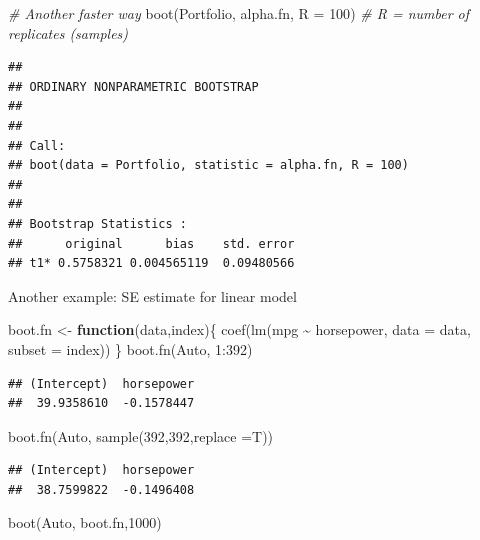 \documentclass[
]{book}
\newenvironment{Shaded}{\begin{snugshade}}{\end{snugshade}}
\newcommand{\AttributeTok}[1]{\textcolor[rgb]{0.77,0.63,0.00}{#1}}
\newcommand{\CommentTok}[1]{\textcolor[rgb]{0.56,0.35,0.01}{\textit{#1}}}
\newcommand{\ControlFlowTok}[1]{\textcolor[rgb]{0.13,0.29,0.53}{\textbf{#1}}}
\newcommand{\DecValTok}[1]{\textcolor[rgb]{0.00,0.00,0.81}{#1}}
\newcommand{\FunctionTok}[1]{\textcolor[rgb]{0.00,0.00,0.00}{#1}}
\newcommand{\NormalTok}[1]{#1}
\newcommand{\OtherTok}[1]{\textcolor[rgb]{0.56,0.35,0.01}{#1}}
\newcommand{\SpecialCharTok}[1]{\textcolor[rgb]{0.00,0.00,0.00}{#1}}
\begin{document}
\begin{Shaded}
\begin{Highlighting}[]
\CommentTok{\# Another faster way}
\FunctionTok{boot}\NormalTok{(Portfolio, alpha.fn, }\AttributeTok{R =} \DecValTok{100}\NormalTok{) }\CommentTok{\# R = number of replicates (samples)}
\end{Highlighting}
\end{Shaded}

\begin{verbatim}
## 
## ORDINARY NONPARAMETRIC BOOTSTRAP
## 
## 
## Call:
## boot(data = Portfolio, statistic = alpha.fn, R = 100)
## 
## 
## Bootstrap Statistics :
##      original      bias    std. error
## t1* 0.5758321 0.004565119  0.09480566
\end{verbatim}

Another example: SE estimate for linear model

\begin{Shaded}
\begin{Highlighting}[]
\NormalTok{boot.fn }\OtherTok{\textless{}{-}} \ControlFlowTok{function}\NormalTok{(data,index)\{}
    \FunctionTok{coef}\NormalTok{(}\FunctionTok{lm}\NormalTok{(mpg }\SpecialCharTok{\textasciitilde{}}\NormalTok{ horsepower, }\AttributeTok{data =}\NormalTok{ data, }\AttributeTok{subset =}\NormalTok{ index))}
\NormalTok{\}}
\FunctionTok{boot.fn}\NormalTok{(Auto, }\DecValTok{1}\SpecialCharTok{:}\DecValTok{392}\NormalTok{)}
\end{Highlighting}
\end{Shaded}

\begin{verbatim}
## (Intercept)  horsepower 
##  39.9358610  -0.1578447
\end{verbatim}

\begin{Shaded}
\begin{Highlighting}[]
\FunctionTok{boot.fn}\NormalTok{(Auto, }\FunctionTok{sample}\NormalTok{(}\DecValTok{392}\NormalTok{,}\DecValTok{392}\NormalTok{,}\AttributeTok{replace =}\NormalTok{T))}
\end{Highlighting}
\end{Shaded}

\begin{verbatim}
## (Intercept)  horsepower 
##  38.7599822  -0.1496408
\end{verbatim}

\begin{Shaded}
\begin{Highlighting}[]
\FunctionTok{boot}\NormalTok{(Auto, boot.fn,}\DecValTok{1000}\NormalTok{)}
\end{Highlighting}
\end{Shaded}
\end{document}
